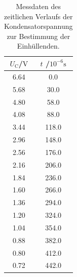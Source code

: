 \begin{table}
	\caption{Messdaten des zeitlichen Verlaufs der Kondensatorspannung zur Bestimmung der Einhüllenden.}
	\label{tab:messung1}
	\centering
	\begin{tabular}{cc}
		\toprule
		$U_\text{C}$/$\si{\volt}$ & $t$ /$10^{-6}\si{\second}$ \\
		\midrule
		6.64                      & 0.0                        \\
		5.68                      & 30.0                       \\
		4.80                      & 58.0                       \\
		4.08                      & 88.0                       \\
		3.44                      & 118.0                      \\
		2.96                      & 148.0                      \\
		2.56                      & 176.0                      \\
		2.16                      & 206.0                      \\
		1.84                      & 236.0                      \\
		1.60                      & 266.0                      \\
		1.36                      & 294.0                      \\
		1.20                      & 324.0                      \\
		1.04                      & 354.0                      \\
		0.88                      & 382.0                      \\
		0.80                      & 412.0                      \\
		0.72                      & 442.0                      \\
		\bottomrule
	\end{tabular}
\end{table}


